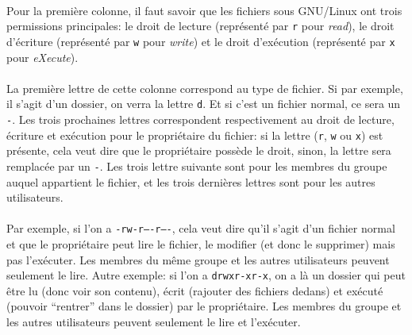 \paragraph{} Pour la première colonne, il faut savoir que les fichiers sous
GNU/Linux ont trois permissions principales: le droit de lecture (représenté
par \texttt{r} pour \emph{read}), le droit d'écriture (représenté par
\texttt{w} pour \emph{write}) et le droit d'exécution (représenté par
\texttt{x} pour \emph{eXecute}).

\paragraph{} La première lettre de cette colonne correspond au type de fichier.
Si par exemple, il s'agit d'un dossier, on verra la lettre \texttt{d}.  Et si
c'est un fichier normal, ce sera un \texttt{-}. Les trois prochaines lettres
correspondent respectivement au droit de lecture, écriture et exécution pour le
propriétaire du fichier: si la lettre (\texttt{r}, \texttt{w} ou \texttt{x})
est présente, cela veut dire que le propriétaire possède le droit, sinon, la
lettre sera remplacée par un \texttt{-}. Les trois lettre suivante sont pour
les membres du groupe auquel appartient le fichier, et les trois dernières
lettres sont pour les autres utilisateurs.

\paragraph{} Par exemple, si l'on a \texttt{-rw-r----r----}, cela veut dire
qu'il s'agit d'un fichier normal et que le propriétaire peut lire le fichier,
le modifier (et donc le supprimer) mais pas l'exécuter. Les membres du même
groupe et les autres utilisateurs peuvent seulement le lire. Autre exemple: si
l'on a \texttt{drwxr-xr-x}, on a là un dossier qui peut être lu (donc voir son
contenu), écrit (rajouter des fichiers dedans) et exécuté (pouvoir ``rentrer''
dans le dossier) par le propriétaire. Les membres du groupe et les autres
utilisateurs peuvent seulement le lire et l'exécuter.

